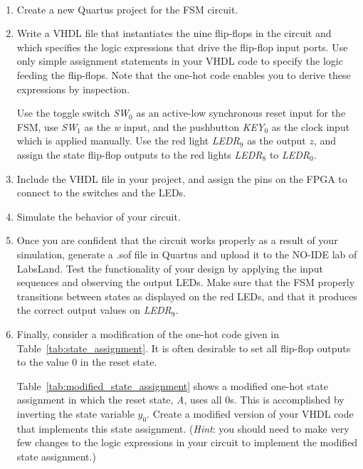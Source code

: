 \documentclass[epsfig,10pt,fullpage]{article}
\begin{document}
\begin{enumerate}
\item Create a new Quartus\textsuperscript{\textregistered} project for the FSM circuit. 

\item Write a VHDL file that instantiates the nine flip-flops in the circuit and which
specifies the logic expressions that drive the flip-flop input ports. Use only
simple assignment statements in your VHDL code to specify the logic feeding the
flip-flops. Note that the one-hot code enables you to derive these expressions by
inspection.

Use the toggle switch {\it SW}$_0$ as an active-low synchronous reset input
for the FSM, use {\it SW}$_1$ as the {\it w} input, and the pushbutton {\it KEY}$_0$ as the clock input which 
is applied manually.  Use the red light {\it LEDR}$_9$ as the output $z$, 
and assign the state flip-flop outputs to the red lights {\it LEDR}$_8$ to {\it LEDR}$_0$.

\item Include the VHDL file in your project, and assign the pins on the FPGA to 
connect to the switches and the LEDs.

\item Simulate the behavior of your circuit.

\item Once you are confident that the circuit works properly as a result of your
simulation, generate a .sof file in Quartus and upload it to the NO-IDE lab of LabsLand.  Test the functionality of your 
design by applying the input sequences and observing the output LEDs. Make sure that the
FSM properly transitions between states as displayed on the red LEDs, and that it produces
the correct output values on {\it LEDR}$_9$.

\item Finally, consider a modification of the one-hot code given in Table~\ref{tab:state_assignment}. It is often 
desirable to set all flip-flop outputs to the value 0 in the reset state.

Table~\ref{tab:modified_state_assignment} shows a modified one-hot state assignment in which the reset state, {\it A},
uses all 0s. This is accomplished by inverting the state variable $y_0$. 
Create a modified version of your VHDL code that implements this state
assignment. ({\it Hint}: you should need to make very few changes to the logic expressions
in your circuit to implement the modified state assignment.) 


\end{enumerate}
\end{document}
